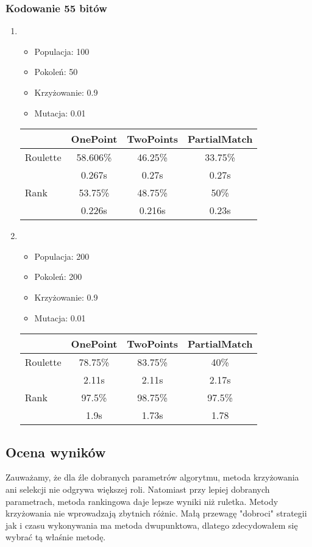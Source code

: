 \documentclass[a4paper,12pkt]{article}
\begin{document}
\subsubsection{Kodowanie 55 bitów}
\begin{enumerate}
\item
\begin{itemize}
\item Populacja: 100
\item Pokoleń: 50
\item Krzyżowanie: 0.9
\item Mutacja: 0.01
\end{itemize}
\begin{tabular}{l|c|c|c}
&OnePoint&TwoPoints&PartialMatch\\ \hline
Roulette&58.606\%&46.25\%&33.75\%	\\
&0.267s&0.27s&0.27s\\ \hline
Rank&53.75\%&48.75\%&50\%\\
&0.226s&0.216s&0.23s\\ \hline
\end{tabular}
\item
\begin{itemize}
\item Populacja: 200
\item Pokoleń: 200
\item Krzyżowanie: 0.9
\item Mutacja: 0.01
\end{itemize}
\begin{tabular}{l|c|c|c}
&OnePoint&TwoPoints&PartialMatch\\ \hline
Roulette&78.75\%&83.75\%&40\%\\
&2.11s&2.11s&2.17s\\ \hline
Rank&97.5\%&98.75\%&97.5\% \\
&1.9s&1.73s&1.78\\ \hline
\end{tabular}
\end{enumerate}
\subsection{Ocena wyników}
Zauważamy, że dla źle dobranych parametrów algorytmu, metoda krzyżowania ani selekcji nie odgrywa większej roli. Natomiast przy lepiej dobranych parametrach, metoda rankingowa daje lepsze wyniki niż ruletka. Metody krzyżowania nie wprowadzają zbytnich różnic. Małą przewagę "dobroci" strategii jak i czasu wykonywania ma metoda dwupunktowa, dlatego zdecydowałem się wybrać tą właśnie metodę.
\end{document}
